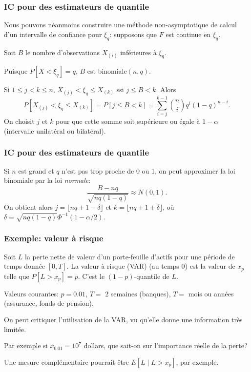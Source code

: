 \documentclass[t,usepdftitle=false]{beamer}
\begin{document}
\begin{frame}
\frametitle{IC pour des estimateurs de quantile}

Nous pouvons néanmoins construire une méthode non-asymptotique de
calcul d'un intervalle de confiance pour $\xi_q$: supposons que $F$ est continue en $\xi_q$.

\mbox{}

Soit ${B}$ le nombre d'observations $X_{(i)}$ inférieures à $\xi_q$.

\mbox{}

Puisque $P[X < \xi_q] = q$, $B$ est binomiale$(n,q)$.

\mbox{}

Si $1\le j < k \le n$, $X_{(j)} < \xi_q \leq X_{(k)}$ ssi $j \leq B < k$.
Alors
\[
 P[{X_{(j)}} < \xi_q \le {X_{(k)}}]
 =  P[j\le B < k] 
 = \sum_{i=j}^{k-1} {n\choose i}  q^i(1-q)^{n-i}. 
\]
On choisit ${j}$ et ${k}$ pour que cette somme soit supérieure ou
égale à $1-\alpha$ (intervalle unilatéral ou bilatéral).

\end{frame}

\begin{frame}
\frametitle{IC pour des estimateurs de quantile}

Si $n$ est grand et $q$ n'est pas trop proche de 0 ou 1, on peut
approximer la loi binomiale par la loi \emph{normale}:
\[
\frac{B - nq}{\sqrt{nq(1-q)}} \approx N(0,1).
\]
On obtient alors $j = \lfloor nq + 1 - \delta\rfloor$ et 
$k = \lfloor nq + 1 + \delta\rfloor$, où
$\delta = \sqrt{nq(1-q)}\Phi^{-1}(1-\alpha/2)$.

\end{frame}

\begin{frame}
\frametitle{Exemple: valeur à risque}

Soit ${L}$ la perte nette de valeur d'un porte-feuille d'actifs pour
une période de temps donnée $[0,{T}]$.
La valeur à risque (VAR) (au
temps 0) est la valeur de ${x_p}$ telle que $P[L > x_p] = p$.
C'est le $(1-p)$-quantile de $L$.

\mbox{}

Valeurs courantes: $p = 0.01$, $T=$ 2 semaines (banques),
$T=$ mois ou années (assurance, fonds de pension).

\mbox{}

On peut critiquer l'utilisation de la VAR, vu qu'elle
donne une information très limitée.

\mbox{}

Par exemple si $x_{0.01} = 10^7$ dollars, que sait-on sur l'importance
réelle de la perte?

\mbox{}

Une mesure complémentaire pourrait être $E[L \mid L > x_p]$, 
par exemple.

\end{frame}
\end{document}
